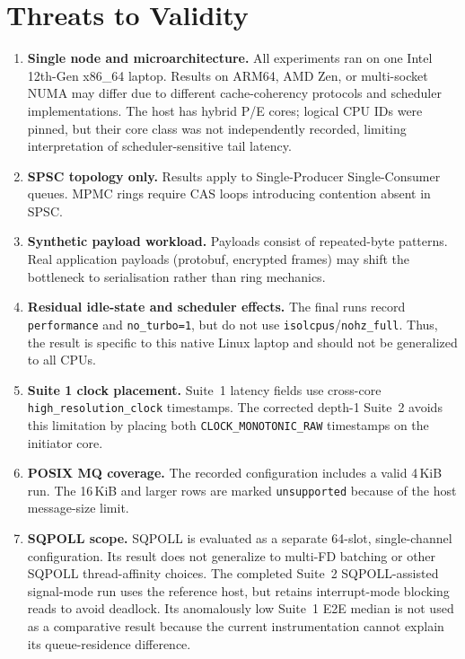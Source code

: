 \documentclass[10pt,conference]{IEEEtran}
\begin{document}
\section{Threats to Validity}
\label{sec:threats}

\begin{enumerate}
  \item \textbf{Single node and microarchitecture.}  All experiments ran on one
        Intel 12th-Gen x86\_64 laptop.  Results on ARM64, AMD Zen, or
        multi-socket NUMA may differ due to different cache-coherency
        protocols and scheduler implementations.  The host has hybrid P/E
        cores; logical CPU IDs were pinned, but their core class was not
        independently recorded, limiting interpretation of scheduler-sensitive
        tail latency.

  \item \textbf{SPSC topology only.}  Results apply to Single-Producer
        Single-Consumer queues.  MPMC rings require CAS loops introducing
        contention absent in SPSC.

  \item \textbf{Synthetic payload workload.}  Payloads consist of repeated-byte
        patterns.  Real application payloads (protobuf, encrypted frames)
        may shift the bottleneck to serialisation rather than ring mechanics.

  \item \textbf{Residual idle-state and scheduler effects.}  The final runs
        record \texttt{performance} and \texttt{no\_turbo=1}, but do not use
        \texttt{isolcpus}/\texttt{nohz\_full}.  Thus, the result is specific
        to this native Linux laptop and should not be generalized to all CPUs.

  \item \textbf{Suite 1 clock placement.}  Suite~1 latency fields use
        cross-core \texttt{high\_resolution\_clock} timestamps. The corrected
        depth-1 Suite~2 avoids this limitation by placing both
        \texttt{CLOCK\_MONOTONIC\_RAW} timestamps on the initiator core.

  \item \textbf{POSIX MQ coverage.}  The recorded configuration includes a
        valid 4\,KiB run.  The 16\,KiB and larger rows are marked
        \texttt{unsupported} because of the host message-size limit.

  \item \textbf{SQPOLL scope.}  SQPOLL is evaluated as a separate 64-slot,
        single-channel configuration.  Its result does not generalize to
        multi-FD batching or other SQPOLL thread-affinity choices.  The
        completed Suite~2 SQPOLL-assisted signal-mode run uses the reference
        host, but retains interrupt-mode blocking reads to avoid deadlock. Its
        anomalously low Suite~1 E2E median is not used as a comparative result
        because the current instrumentation cannot explain its queue-residence
        difference.


\end{enumerate}
\end{document}
